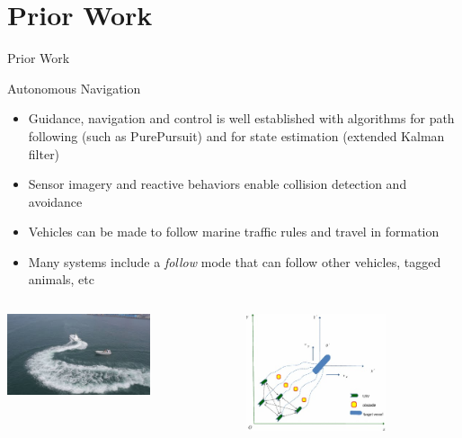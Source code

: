 \documentclass[9pt]{beamer}
\begin{document}
\section{Prior Work} \label{PW:navigation}
\begin{frame}{Prior Work}
    \begin{block}{Autonomous Navigation}
	    \begin{itemize}
    	    \item Guidance, navigation and control is well established with algorithms for path following (such as PurePursuit) and for state estimation (extended Kalman filter)
    	    \item Sensor imagery and reactive behaviors enable collision detection and avoidance
    	    \item Vehicles can be made to follow marine traffic rules and travel in formation
    	    \item Many systems include a \textit{follow} mode that can follow other vehicles, tagged animals, etc
        \end{itemize}
        \begin{columns}
            \begin{column}{0.5\textwidth}
                \begin{center}
                    \includegraphics[width=0.65\textwidth,trim={5cm 1cm 2cm 1cm},clip]{img/collisionavoidance.jpg}
                \end{center}
            \end{column}
            \begin{column}{0.5\textwidth}
                \begin{center}
                    \includegraphics[width=0.65\textwidth,trim={1cm 1cm 4cm 3cm},clip]{img/formation.jpg}
                \end{center}
            \end{column}
        \end{columns}
    \end{block}
\end{frame}
\end{document}
